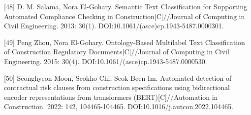 \documentclass{article}
\begin{document}
[48] D. M. Salama, Nora El-Gohary. Semantic Text Classification for Supporting Automated Compliance Checking in Construction[C]//Journal of Computing in Civil Engineering. 2013: 30(1). DOI:10.1061/(asce)cp.1943-5487.0000301.

[49] Peng Zhou, Nora El-Gohary. Ontology-Based Multilabel Text Classification of Construction Regulatory Documents[C]//Journal of Computing in Civil Engineering. 2015: 30(4). DOI:10.1061/(asce)cp.1943-5487.0000530.

[50] Seonghyeon Moon, Seokho Chi, Seok-Been Im. Automated detection of contractual risk clauses from construction specifications using bidirectional encoder representations from transformers (BERT)[C]//Automation in Construction. 2022: 142, 104465-104465. DOI:10.1016/j.autcon.2022.104465.
\end{document}
